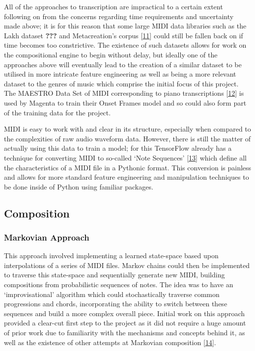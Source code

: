 \documentclass[12pt,]{article}
\begin{document}
All of the approaches to transcription are impractical to a certain
extent following on from the concerns regarding time requirements and
uncertainty made above; it is for this reason that some large MIDI data
libraries such as the Lakh dataset {\textbf{???}} and Metacreation's
corpus {[}\protect\hyperlink{ref-metacreation}{11}{]} could still be
fallen back on if time becomes too constrictive. The existence of such
datasets allows for work on the compositional engine to begin without
delay, but ideally one of the approaches above will eventually lead to
the creation of a similar dataset to be utilised in more intricate
feature engineering as well as being a more relevant dataset to the
genres of music which comprise the initial focus of this project. The
MAESTRO Data Set of MIDI corresponding to piano transcriptions
{[}\protect\hyperlink{ref-maestro2018}{12}{]} is used by Magenta to
train their Onset Frames model and so could also form part of the
training data for the project.

MIDI is easy to work with and clear in its structure, especially when
compared to the complexities of raw audio waveform data. However, there
is still the matter of actually using this data to train a model; for
this TensorFlow already has a technique for converting MIDI to so-called
`Note Sequences' {[}\protect\hyperlink{ref-notesequences}{13}{]} which
define all the characteristics of a MIDI file in a Pythonic format. This
conversion is painless and allows for more standard feature engineering
and manipulation techniques to be done inside of Python using familiar
packages.

\hypertarget{composition}{%
\subsection{Composition}\label{composition}}

\hypertarget{markovian-approach}{%
\subsubsection{Markovian Approach}\label{markovian-approach}}

This approach involved implementing a learned state-space based upon
interpolations of a series of MIDI files. Markov chains could then be
implemented to traverse this state-space and sequentially generate new
MIDI, building compositions from probabilistic sequences of notes. The
idea was to have an `improvisational' algorithm which could
stochastically traverse common progressions and chords, incorporating
the ability to switch between these sequences and build a more complex
overall piece. Initial work on this approach provided a clear-cut first
step to the project as it did not require a huge amount of prior work
due to familiarity with the mechanisms and concepts behind it, as well
as the existence of other attempts at Markovian composition
{[}\protect\hyperlink{ref-markovcomposer}{14}{]}.
\end{document}
